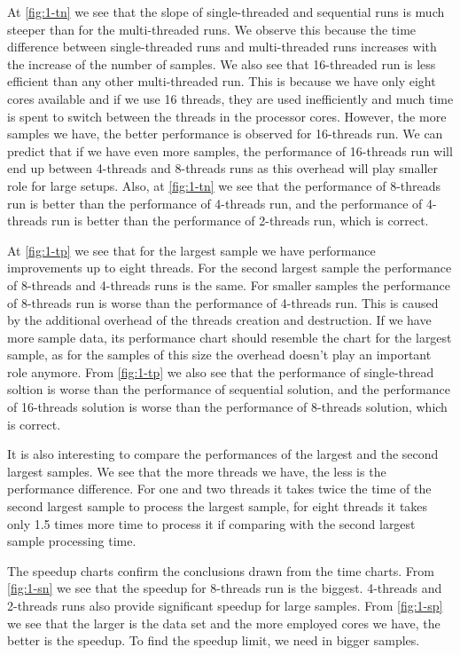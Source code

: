 \documentclass[a4paper,10pt,notitlepage]{article}
\begin{document}
At \autoref{fig:1-tn} we see that the slope of single-threaded and sequential runs is much steeper than for the multi-threaded runs. We observe this because the time difference between single-threaded runs and multi-threaded runs increases with the increase of the number of samples. We also see that 16-threaded run is less efficient than any other multi-threaded run. This is because we have only eight cores available and if we use 16 threads, they are used inefficiently and much time is spent to switch between the threads in the processor cores. However, the more samples we have, the better performance is observed for 16-threads run. We can predict that if we have even more samples, the performance of 16-threads run will end up between 4-threads and 8-threads runs as this overhead will play smaller role for large setups. Also, at \autoref{fig:1-tn} we see that the performance of 8-threads run is better than the performance of 4-threads run, and the performance of 4-threads run is better than the performance of 2-threads run, which is correct.

At \autoref{fig:1-tp} we see that for the largest sample we have performance improvements up to eight threads. For the second largest sample the performance of 8-threads and 4-threads runs is the same. For smaller samples the performance of 8-threads run is worse than the performance of 4-threads run. This is caused by the additional overhead of the threads creation and destruction. If we have more sample data, its performance chart should resemble the chart for the largest sample, as for the samples of this size the overhead doesn't play an important role anymore. From \autoref{fig:1-tp} we also see that the performance of single-thread soltion is worse than the performance of sequential solution, and the performance of 16-threads solution is worse than the performance of 8-threads solution, which is correct.

It is also interesting to compare the performances of the largest and the second largest samples. We see that the more threads we have, the less is the performance difference. For one and two threads it takes twice the time of the second largest sample to process the largest sample, for eight threads it takes only 1.5 times more time to process it if comparing with the second largest sample processing time.

The speedup charts confirm the conclusions drawn from the time charts. From \autoref{fig:1-sn} we see that the speedup for 8-threads run is the biggest. 4-threads and 2-threads runs also provide significant speedup for large samples. From \autoref{fig:1-sp} we see that the larger is the data set and the more employed cores we have, the better is the speedup. To find the speedup limit, we need in bigger samples.
\end{document}
